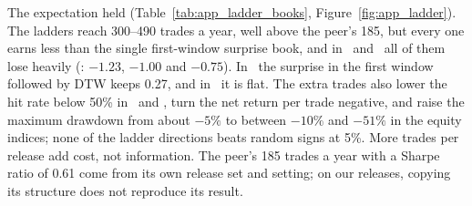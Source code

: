 The expectation held (Table~\ref{tab:app_ladder_books}, Figure~\ref{fig:app_ladder}). The ladders
reach 300--490 trades a year, well above the peer's 185, but every one earns less than the single
first-window surprise book, and in \ES\ and \ZN\ all of them lose heavily (\ES: $-1.23$, $-1.00$ and
$-0.75$). In \NQ\ the surprise in the first window followed by DTW keeps 0.27, and in \YM\ it is flat.
The extra trades also lower the hit rate below 50\% in \ES\ and \ZN, turn the net return per
trade negative, and raise the maximum drawdown from about $-5\%$ to between $-10\%$ and $-51\%$ in the
equity indices; none of the ladder directions beats random signs at 5\%. More trades per release add
cost, not information. The peer's 185 trades a year with a Sharpe ratio of 0.61 come from its own
release set and setting; on our releases, copying its structure does not reproduce its result.

